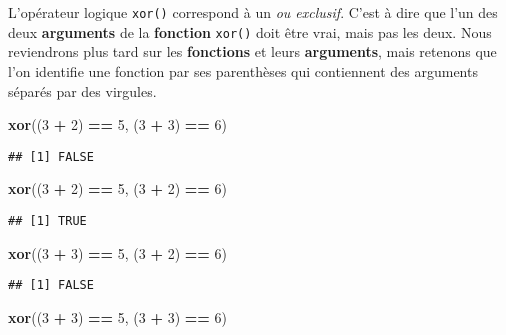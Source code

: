 \documentclass[]{book}
\newenvironment{Shaded}{\begin{snugshade}}{\end{snugshade}}
\newcommand{\KeywordTok}[1]{\textcolor[rgb]{0.13,0.29,0.53}{\textbf{#1}}}
\newcommand{\DecValTok}[1]{\textcolor[rgb]{0.00,0.00,0.81}{#1}}
\newcommand{\StringTok}[1]{\textcolor[rgb]{0.31,0.60,0.02}{#1}}
\newcommand{\OperatorTok}[1]{\textcolor[rgb]{0.81,0.36,0.00}{\textbf{#1}}}
\newcommand{\NormalTok}[1]{#1}
\theoremstyle{definition}
\theoremstyle{definition}
\theoremstyle{definition}
\theoremstyle{remark}
\begin{document}
L'opérateur logique \texttt{xor()} correspond à un \emph{ou exclusif}.
C'est à dire que l'un des deux \textbf{arguments} de la
\textbf{fonction} \texttt{xor()} doit être vrai, mais pas les deux. Nous
reviendrons plus tard sur les \textbf{fonctions} et leurs
\textbf{arguments}, mais retenons que l'on identifie une fonction par
ses parenthèses qui contiennent des arguments séparés par des virgules.

\begin{Shaded}
\begin{Highlighting}[]
\KeywordTok{xor}\NormalTok{((}\DecValTok{3} \OperatorTok{+}\StringTok{ }\DecValTok{2}\NormalTok{) }\OperatorTok{==}\StringTok{ }\DecValTok{5}\NormalTok{, (}\DecValTok{3} \OperatorTok{+}\StringTok{ }\DecValTok{3}\NormalTok{) }\OperatorTok{==}\StringTok{ }\DecValTok{6}\NormalTok{)}
\end{Highlighting}
\end{Shaded}

\begin{verbatim}
## [1] FALSE
\end{verbatim}

\begin{Shaded}
\begin{Highlighting}[]
\KeywordTok{xor}\NormalTok{((}\DecValTok{3} \OperatorTok{+}\StringTok{ }\DecValTok{2}\NormalTok{) }\OperatorTok{==}\StringTok{ }\DecValTok{5}\NormalTok{, (}\DecValTok{3} \OperatorTok{+}\StringTok{ }\DecValTok{2}\NormalTok{) }\OperatorTok{==}\StringTok{ }\DecValTok{6}\NormalTok{)}
\end{Highlighting}
\end{Shaded}

\begin{verbatim}
## [1] TRUE
\end{verbatim}

\begin{Shaded}
\begin{Highlighting}[]
\KeywordTok{xor}\NormalTok{((}\DecValTok{3} \OperatorTok{+}\StringTok{ }\DecValTok{3}\NormalTok{) }\OperatorTok{==}\StringTok{ }\DecValTok{5}\NormalTok{, (}\DecValTok{3} \OperatorTok{+}\StringTok{ }\DecValTok{2}\NormalTok{) }\OperatorTok{==}\StringTok{ }\DecValTok{6}\NormalTok{)}
\end{Highlighting}
\end{Shaded}

\begin{verbatim}
## [1] FALSE
\end{verbatim}

\begin{Shaded}
\begin{Highlighting}[]
\KeywordTok{xor}\NormalTok{((}\DecValTok{3} \OperatorTok{+}\StringTok{ }\DecValTok{3}\NormalTok{) }\OperatorTok{==}\StringTok{ }\DecValTok{5}\NormalTok{, (}\DecValTok{3} \OperatorTok{+}\StringTok{ }\DecValTok{3}\NormalTok{) }\OperatorTok{==}\StringTok{ }\DecValTok{6}\NormalTok{)}
\end{Highlighting}
\end{Shaded}
\end{document}
